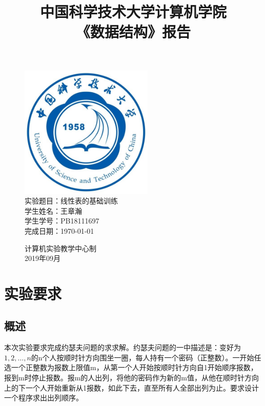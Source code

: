 \documentclass[UTF8]{article}
\title{中国科学技术大学计算机学院\\《数据结构》报告}
\author{}
\date{}
\begin{document}
\maketitle
	\begin{figure}[H]
		\centering
		\includegraphics[width=2.5in]{xiaohui.jpg}\vspace{0.5cm}\\
		\large{
			实验题目：线性表的基础训练\\
			学生姓名：王章瀚\\
			学生学号：PB18111697\\
			完成日期：\today\\
		}\vspace{2cm}
		
		\large{计算机实验教学中心制\\2019年09月\\}
		\thispagestyle{empty}
		\clearpage  %
	\end{figure}
	\newpage
	
	\section{实验要求}
	\subsection{概述}
	本次实验要求完成约瑟夫问题的求求解。约瑟夫问题的一中描述是：变好为$1,2,\dots,n$的n个人按顺时针方向围坐一圈，每人持有一个密码（正整数）。一开始任选一个正整数为报数上限值m，从第一个人开始按顺时针方向自1开始顺序报数，报到m时停止报数。报m的人出列，将他的密码作为新的m值，从他在顺时针方向上的下一个人开始重新从1报数，如此下去，直至所有人全部出列为止。要求设计一个程序求出出列顺序。
	
\end{document}
